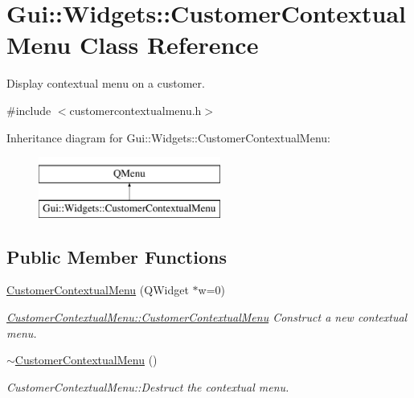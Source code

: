 \hypertarget{classGui_1_1Widgets_1_1CustomerContextualMenu}{}\section{Gui\+:\+:Widgets\+:\+:Customer\+Contextual\+Menu Class Reference}
\label{classGui_1_1Widgets_1_1CustomerContextualMenu}


Display contextual menu on a customer.  




{\ttfamily \#include $<$customercontextualmenu.\+h$>$}

Inheritance diagram for Gui\+:\+:Widgets\+:\+:Customer\+Contextual\+Menu\+:\begin{figure}[H]
\begin{center}
\leavevmode
\includegraphics[height=2.000000cm]{d8/ded/classGui_1_1Widgets_1_1CustomerContextualMenu}
\end{center}
\end{figure}
\subsection*{Public Member Functions}
\begin{DoxyCompactItemize}
\item 
\hyperlink{classGui_1_1Widgets_1_1CustomerContextualMenu_ab8fc199bd6adf21f7dd5e881e0a73b16}{Customer\+Contextual\+Menu} (Q\+Widget $\ast$w=0)
\begin{DoxyCompactList}\small\item\em \hyperlink{classGui_1_1Widgets_1_1CustomerContextualMenu_ab8fc199bd6adf21f7dd5e881e0a73b16}{Customer\+Contextual\+Menu\+::\+Customer\+Contextual\+Menu} Construct a new contextual menu. \end{DoxyCompactList}\item 
\hypertarget{classGui_1_1Widgets_1_1CustomerContextualMenu_a6814dcf744752f9026c85a9640cf23ef}{}\hyperlink{classGui_1_1Widgets_1_1CustomerContextualMenu_a6814dcf744752f9026c85a9640cf23ef}{$\sim$\+Customer\+Contextual\+Menu} ()\label{classGui_1_1Widgets_1_1CustomerContextualMenu_a6814dcf744752f9026c85a9640cf23ef}

\begin{DoxyCompactList}\small\item\em Customer\+Contextual\+Menu\+::\+Destruct the contextual menu. \end{DoxyCompactList}\end{DoxyCompactItemize}


